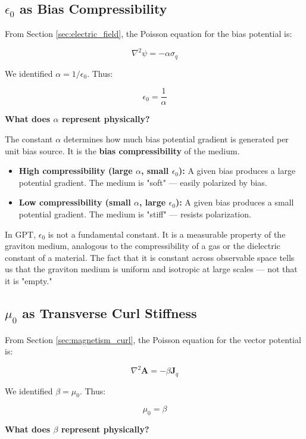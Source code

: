 \documentclass[12pt, a4paper]{article}
\begin{document}
\subsection{\( \epsilon_0 \) as Bias Compressibility}
\label{subsec:epsilon_compressibility}

From Section \ref{sec:electric_field}, the Poisson equation for the bias potential is:

\[
\nabla^2 \psi = -\alpha \sigma_q
\]

We identified \( \alpha = 1/\epsilon_0 \). Thus:

\[
\epsilon_0 = \frac{1}{\alpha}
\]

\textbf{What does \( \alpha \) represent physically?}

The constant \( \alpha \) determines how much bias potential gradient is generated per unit bias source. It is the \textbf{bias compressibility} of the medium.

\begin{itemize}
    \item \textbf{High compressibility (large \( \alpha \), small \( \epsilon_0 \)):} A given bias produces a large potential gradient. The medium is "soft" — easily polarized by bias.
    \item \textbf{Low compressibility (small \( \alpha \), large \( \epsilon_0 \)):} A given bias produces a small potential gradient. The medium is "stiff" — resists polarization.
\end{itemize}

In GPT, \( \epsilon_0 \) is not a fundamental constant. It is a measurable property of the graviton medium, analogous to the compressibility of a gas or the dielectric constant of a material. The fact that it is constant across observable space tells us that the graviton medium is uniform and isotropic at large scales — not that it is "empty."

\subsection{\( \mu_0 \) as Transverse Curl Stiffness}
\label{subsec:mu0_stiffness}

From Section \ref{sec:magnetism_curl}, the Poisson equation for the vector potential is:

\[
\nabla^2 \mathbf{A} = -\beta \mathbf{J}_q
\]

We identified \( \beta = \mu_0 \). Thus:

\[
\mu_0 = \beta
\]

\textbf{What does \( \beta \) represent physically?}
\end{document}

